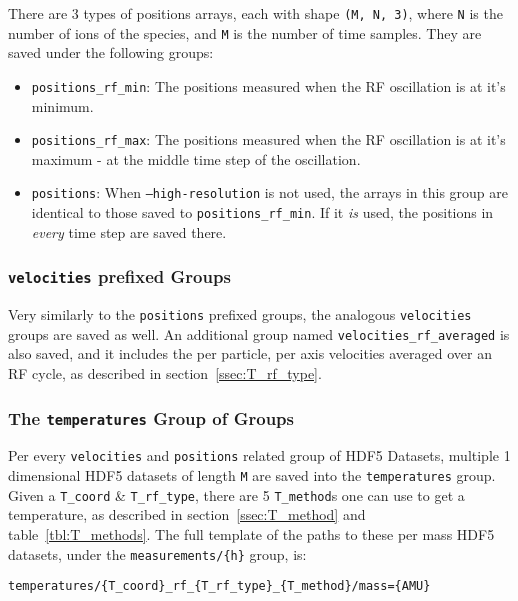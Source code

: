 There are 3 types of positions arrays, each with shape \texttt{(M, N, 3)}, where \texttt{N} is the number of ions of the species, and \texttt{M} is the number of time samples. They are saved under the following groups:

\begin{itemize}
	\item \texttt{positions\_rf\_min}: The positions measured when the RF oscillation is at it's minimum.
	\item \texttt{positions\_rf\_max}: The positions measured when the RF oscillation is at it's maximum - at the middle time step of the oscillation.
	\item \texttt{positions}: When \texttt{--high-resolution} is not used, the arrays in this group are identical to those saved to \texttt{positions\_rf\_min}. If it \emph{is} used, the positions in \emph{every} time step are saved there.
\end{itemize}

\subsubsection{\texttt{velocities} prefixed Groups}

Very similarly to the \texttt{positions} prefixed groups, the analogous \texttt{velocities} groups are saved as well. An additional group named \texttt{velocities\_rf\_averaged} is also saved, and it includes the per particle, per axis velocities averaged over an RF cycle, as described in section~\ref{ssec:T_rf_type}.

\subsubsection{The \texttt{temperatures} Group of Groups}

Per every \texttt{velocities} and \texttt{positions} related group of HDF5 Datasets, multiple 1 dimensional HDF5 datasets of length \texttt{M} are saved into the \texttt{temperatures} group. Given a \texttt{T\_coord} \& \texttt{T\_rf\_type}, there are 5 \texttt{T\_method}s one can use to get a temperature, as described in section~\ref{ssec:T_method} and table~\ref{tbl:T_methods}. The full template of the paths to these per mass HDF5 datasets, under the \texttt{measurements/\{h\}} group, is:

\begin{verbatim}
temperatures/{T_coord}_rf_{T_rf_type}_{T_method}/mass={AMU}
\end{verbatim}

